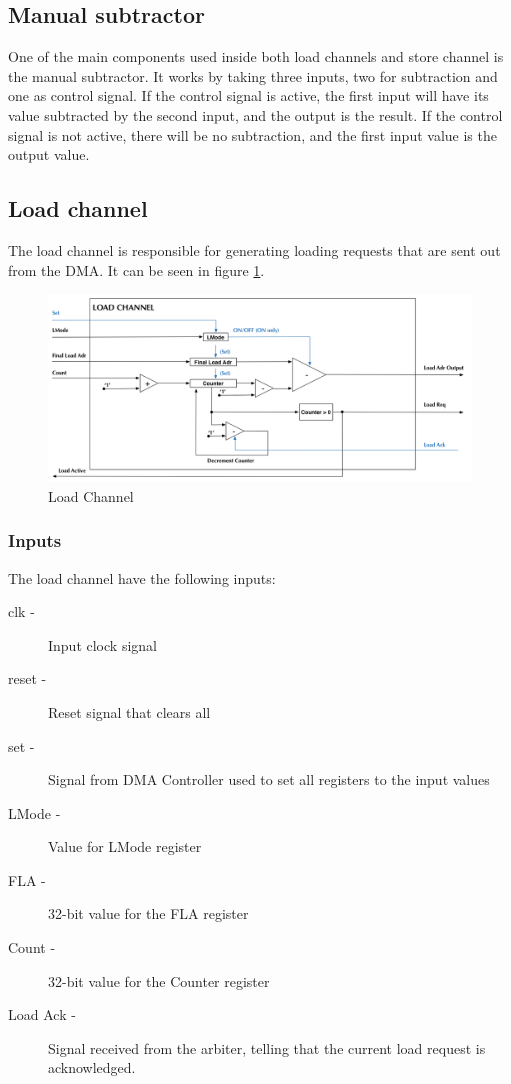 \begin{appendix}
\subsection{Manual subtractor}
One of the main components used inside both load channels and store channel is the manual subtractor.
It works by taking three inputs, two for subtraction and one as control signal.
If the control signal is active, the first input will have its value subtracted by the second input, and the output is the result.
If the control signal is not active, there will be no subtraction, and the first input value is the output value. 

\subsection{Load channel}
The load channel is responsible for generating loading requests that are sent out from the DMA.
It can be seen in figure \ref{fig:loadChannel}.

\begin{figure}[h!]
    \centering
    \includegraphics[width=1.0\textwidth]{Figures/DMA/LoadChannel}
    \caption{Load Channel}
    \label{fig:loadChannel}
\end{figure}

\subsubsection{Inputs}
The load channel have the following inputs:

\begin{description}
    \item[clk -]
    Input clock signal
    \item[reset -]
    Reset signal that clears all 
    \item[set - ]
    Signal from DMA Controller used to set all registers to the input values
    \item[LMode -]
    Value for LMode register
    \item[FLA -]
    32-bit value for the FLA register
    \item[Count -]
    32-bit value for the Counter register
    \item[Load Ack -]
    Signal received from the arbiter, telling that the current load request is acknowledged.
\end{description}


\end{appendix}
